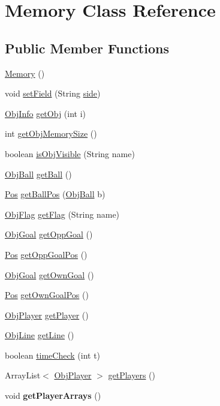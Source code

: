 \hypertarget{classMemory}{
\section{Memory Class Reference}
\label{classMemory}
}
\subsection*{Public Member Functions}
\begin{DoxyCompactItemize}
\item 
\hyperlink{classMemory_a585d7bb6fc6f2237bcebf94a86b7dd99}{Memory} ()
\item 
void \hyperlink{classMemory_a074cc68eab666eb5c8b2b63c8e2065de}{setField} (String \hyperlink{classMemory_ac56cee169ca4e880744065f25f306b82}{side})
\item 
\hyperlink{classObjInfo}{ObjInfo} \hyperlink{classMemory_a608d5c05e19521c10a7cda5d363a8dc1}{getObj} (int i)
\item 
int \hyperlink{classMemory_a43b05e7409d9f1898d5570c38c533489}{getObjMemorySize} ()
\item 
boolean \hyperlink{classMemory_a3229c1214b10c55d92bfea56231c463e}{isObjVisible} (String name)
\item 
\hyperlink{classObjBall}{ObjBall} \hyperlink{classMemory_a22a84014b7be5f41133a2b9dc1239d77}{getBall} ()
\item 
\hyperlink{classPos}{Pos} \hyperlink{classMemory_a96efccb45ccabb805f763051d00a3435}{getBallPos} (\hyperlink{classObjBall}{ObjBall} b)
\item 
\hyperlink{classObjFlag}{ObjFlag} \hyperlink{classMemory_afb25c0954e27945a3710e6c7aa517061}{getFlag} (String name)
\item 
\hyperlink{classObjGoal}{ObjGoal} \hyperlink{classMemory_a17ae657b29be91c6008d77c23e1626fc}{getOppGoal} ()
\item 
\hyperlink{classPos}{Pos} \hyperlink{classMemory_a0e1a6e8f80b1dd3f53d4825e57344c8b}{getOppGoalPos} ()
\item 
\hyperlink{classObjGoal}{ObjGoal} \hyperlink{classMemory_a2383a8213623bc69db35001830366e9d}{getOwnGoal} ()
\item 
\hyperlink{classPos}{Pos} \hyperlink{classMemory_ac33b04415ba7a2c6b11701042e2f0309}{getOwnGoalPos} ()
\item 
\hyperlink{classObjPlayer}{ObjPlayer} \hyperlink{classMemory_a9962f5f66c44c8c68e29efad2cf06cc8}{getPlayer} ()
\item 
\hyperlink{classObjLine}{ObjLine} \hyperlink{classMemory_a1beaea5588dcb18238b35cef6f22d35c}{getLine} ()
\item 
boolean \hyperlink{classMemory_a228504f0a8e83eb4875549bcc6c69b7d}{timeCheck} (int t)
\item 
ArrayList$<$ \hyperlink{classObjPlayer}{ObjPlayer} $>$ \hyperlink{classMemory_aeb561c441b5219aa0f403296162589cd}{getPlayers} ()
\item 
\hypertarget{classMemory_a91beef231ac2a850e50bfdf8688c5297}{
void {\bfseries getPlayerArrays} ()}
\label{classMemory_a91beef231ac2a850e50bfdf8688c5297}


\end{DoxyCompactItemize}
